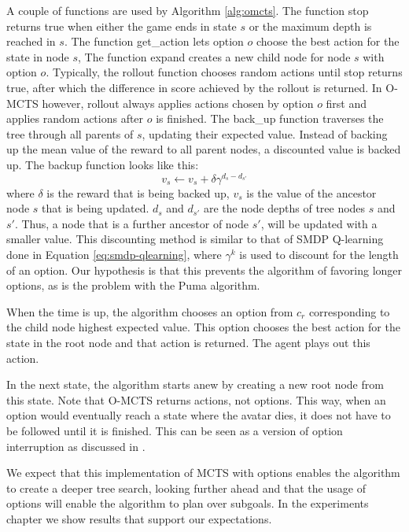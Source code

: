 A couple of functions are used by Algorithm \ref{alg:omcts}. The function
\textsf{stop} returns true when either the game ends in state $s$ or the maximum
depth is reached in $s$. The function \textsf{get\_action} lets option $o$
choose the best action for the state in node $s$, The
function \textsf{expand} creates a new child node for node $s$ with option $o$.
Typically, the \textsf{rollout} function chooses random actions until
\textsf{stop} returns true, after which the difference in score achieved by the
rollout is returned.  In O-MCTS however, \textsf{rollout} always applies actions
chosen by option $o$ first and applies random actions after $o$ is finished. The
\textsf{back\_up} function traverses the tree through all parents of $s$,
updating their expected value. Instead of backing up the mean value of the
reward to all parent nodes, a discounted value is backed up. The backup function
looks like this:
\begin{equation}
	v_s \gets v_s + \delta\gamma^{d_s-d_{s'}}
\end{equation}
where $\delta$ is the reward that is being backed up, $v_s$ is the value of the
ancestor node $s$ that is being updated. $d_s$ and $d_{s'}$ are the node depths
of tree nodes $s$ and $s'$. Thus, a node that is a further ancestor of node
$s'$, will be updated with a smaller value. This discounting method is similar
to that of SMDP Q-learning done in Equation \ref{eq:smdp-qlearning}, where
$\gamma^k$ is used to discount for the length of an option. Our hypothesis is
that this prevents the algorithm of favoring longer options, as is the problem
with the Puma algorithm.

When the time is up, the algorithm chooses an option from $c_r$ corresponding to
the child node highest expected value. This option chooses the best
action for the state in the root node and that action is returned. The agent
plays out this action. 

In the next state, the algorithm starts anew by creating a new root node from
this state. Note that O-MCTS returns actions, not options. This way, when an
option would eventually reach a state where the avatar dies, it does not have to
be followed until it is finished. This can be seen as a version of option
interruption as discussed in \cite{sutton1999between}.

We expect that this implementation of MCTS with options enables the algorithm to
create a deeper tree search, looking further ahead and that the usage of options
will enable the algorithm to plan over subgoals. In the experiments chapter we
show results that support our expectations.
